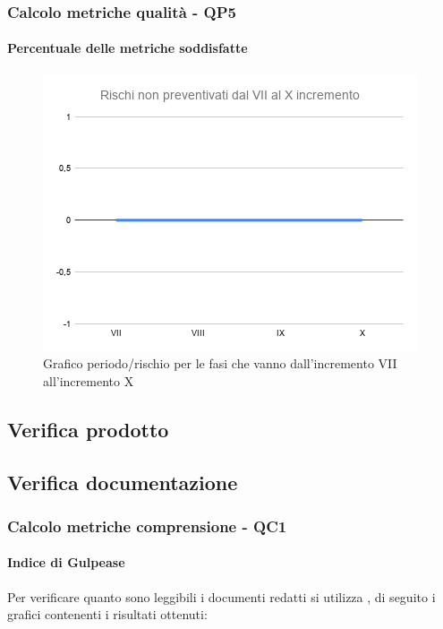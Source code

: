 \subsubsection{Calcolo metriche qualità - QP5}
\paragraph{Percentuale delle metriche soddisfatte}
\begin{figure}[H]
			\centering%
			\includegraphics[width=0.8\linewidth]{./res/images/RischiNonPreven_4.png}
			\caption{Grafico periodo/rischio per le fasi che vanno dall'incremento VII all'incremento X}
			\label{fig:Grafico periodo/rischio per le fasi che vanno dall'incremento VII all'incremento X}
	\end{figure}

\subsection{Verifica prodotto}


\subsection{Verifica documentazione}

\subsubsection{Calcolo metriche comprensione - QC1}

\paragraph{Indice di Gulpease}
Per verificare quanto sono leggibili i documenti redatti si utilizza , di seguito i grafici contenenti i risultati ottenuti:

